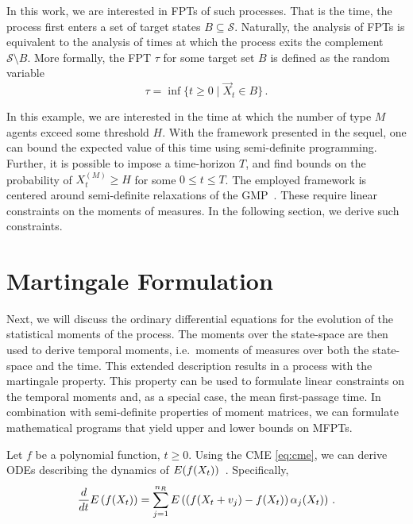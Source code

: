In this work, we are interested in \acfp{FPT} of such processes.
That is the time, the process first enters a set of target states
$B\subseteq \mathcal{S}$. Naturally, the analysis of \acp{FPT} is
equivalent
to the analysis of times at which the process exits the complement $\mathcal{S}\setminus B$.
More formally, the \acl{FPT} $\tau$ for
some target set $B$ is defined as the random variable
\begin{equation}\label{eq:fpt_def}
    \tau = \inf\{t\geq 0\mid \vec X_t \in B\}\,.
\end{equation}


In this example, we are interested in the time at which the number of type $M$ agents
exceed some threshold $H$.
With the framework presented in the sequel, one can bound the expected value
of this time using semi-definite programming.
Further, it is possible to impose a time-horizon $T$, and find bounds
on the probability of $ X_t^{(M)}\geq H$ for some $0\leq t\leq T$.
The employed framework is centered around semi-definite relaxations
of the \ac{GMP}~\cite{lasserre2010moments}.
These require linear constraints on the moments of measures.
In the following section, we derive such constraints.

\section{Martingale Formulation}\label{sec:mfpt:moments}
Next, we will discuss the ordinary differential equations for the evolution of the statistical moments of
the process.
The moments over the state-space are then used to derive temporal moments, i.e.\ moments
of measures over both the state-space and the time.
This extended description results in a process with the martingale property.
This property can be used to formulate linear constraints on the temporal moments
and, as a special case, the mean first-passage time.
In combination with semi-definite properties of moment matrices, we can formulate
mathematical programs that yield upper and lower bounds on \aclp{MFPT}.


Let $f$ be a polynomial function, $t\ge0$.
Using the \ac{CME} \eqref{eq:cme}, we can derive \acp{ODE}
describing the dynamics of ${E}(f(X_t))$~\cite{engblom2006computing}.
Specifically,
\begin{equation}\label{eq:mfpt:mom_ode}
    \frac{d}{dt}{E}\left(f(X_t)\right) = \sum_{j=1}^{n_R}{E}\left(\left(f({X_t +
    v_j}) - f(X_t)\right)\alpha_j(X_t)\right)\,.
\end{equation}

